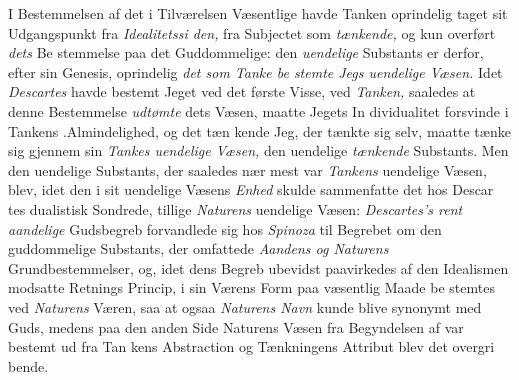 I Bestemmelsen af det i Tilværelsen Væsentlige havde
Tanken oprindelig taget sit Udgangspunkt fra \emph{Idealitetssi\-%
den,} fra Subjectet som \emph{tænkende,} og kun overført \emph{dets} Be\-%
stemmelse paa det Guddommelige: den \emph{uendelige} Substants
er derfor, efter sin Genesis, oprindelig \emph{det som Tanke be\-%
stemte Jegs uendelige Væsen.} Idet \emph{Descartes} havde
bestemt Jeget ved det første Visse, ved \emph{Tanken,} saaledes at
denne Bestemmelse \emph{udtømte} dets Væsen, maatte Jegets In\-%
dividualitet forsvinde i Tankens .Almindelighed, og det tæn\-%
kende Jeg, der tænkte sig selv, maatte tænke sig gjennem
sin \emph{Tankes uendelige Væsen,} den uendelige \emph{tænkende}
Substants. Men den uendelige Substants, der saaledes nær\-%
mest var \emph{Tankens} uendelige Væsen, blev, idet den i sit
uendelige Væsens \emph{Enhed} skulde sammenfatte det hos Descar\-%
tes dualistisk Sondrede, tillige \emph{Naturens} uendelige Væsen:
\emph{Descartes's rent aandelige} Gudsbegreb forvandlede sig
hos \emph{Spinoza} til Begrebet om den guddommelige Substants,
der omfattede \emph{Aandens og Naturens} Grundbestemmelser, og,
idet dens Begreb ubevidst paavirkedes af den Idealismen modsatte
Retnings Princip, i sin Værens Form paa væsentlig Maade be\-%
stemtes ved \emph{Naturens} Væren, saa at ogsaa \emph{Naturens Navn}
kunde blive synonymt med Guds, medens paa den anden Side
Naturens Væsen fra Begyndelsen af var bestemt ud fra Tan\-%
kens Abstraction og Tænkningens Attribut blev det overgri\-%
bende.

